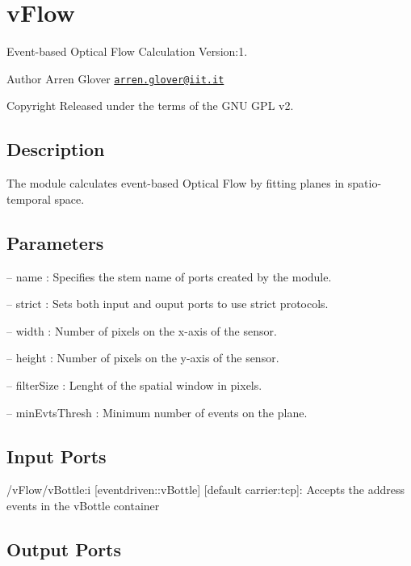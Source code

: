 \hypertarget{group__vFlow}{}\section{v\+Flow}
\label{group__vFlow}
Event-\/based Optical Flow Calculation Version\+:1. \begin{DoxyAuthor}{Author}
Arren Glover \href{mailto:arren.glover@iit.it}{\tt arren.\+glover@iit.\+it} ~\newline
 
\end{DoxyAuthor}
\begin{DoxyCopyright}{Copyright}
Released under the terms of the G\+NU G\+PL v2. 
\end{DoxyCopyright}
\hypertarget{group__zynqGrabber_intro_sec}{}\subsection{Description}\label{group__zynqGrabber_intro_sec}
The module calculates event-\/based Optical Flow by fitting planes in spatio-\/temporal space.\hypertarget{group__zynqGrabber_parameters_sec}{}\subsection{Parameters}\label{group__zynqGrabber_parameters_sec}

\begin{DoxyItemize}
\item -- name \+: Specifies the stem name of ports created by the module.
\item -- strict \+: Sets both input and ouput ports to use strict protocols.
\item -- width \+: Number of pixels on the x-\/axis of the sensor.
\item -- height \+: Number of pixels on the y-\/axis of the sensor.
\item -- filter\+Size \+: Lenght of the spatial window in pixels.
\item -- min\+Evts\+Thresh \+: Minimum number of events on the plane. 
\end{DoxyItemize}\hypertarget{group__zynqGrabber_inputports_sec}{}\subsection{Input Ports}\label{group__zynqGrabber_inputports_sec}

\begin{DoxyItemize}
\item /v\+Flow/v\+Bottle\+:i \mbox{[}eventdriven\+::v\+Bottle\mbox{]} \mbox{[}default carrier\+:tcp\mbox{]}\+: Accepts the address events in the v\+Bottle container
\end{DoxyItemize}\hypertarget{group__zynqGrabber_outputports_sec}{}\subsection{Output Ports}\label{group__zynqGrabber_outputports_sec}

